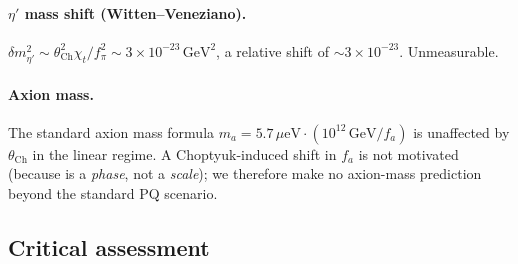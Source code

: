 \paragraph{$\eta'$ mass shift (Witten--Veneziano).}
$\delta m_{\eta'}^2\sim\theta_{\mathrm{Ch}}^2\chi_t/f_\pi^2\sim 3\times 10^{-23}\,\mathrm{GeV}^2$,
a relative shift of $\sim 3\times 10^{-23}$.  Unmeasurable.

\paragraph{Axion mass.}
The standard axion mass formula $m_a=5.7\,\mu\mathrm{eV}\cdot(10^{12}\,\mathrm{GeV}/f_a)$
is unaffected by $\theta_{\mathrm{Ch}}$ in the linear regime.  A
Choptyuk-induced shift in $f_a$ is not motivated (because \aC{} is a
\emph{phase}, not a \emph{scale}); we therefore make no axion-mass
prediction beyond the standard PQ scenario.

\subsection{Critical assessment}
\label{ssec:critical-v2}

